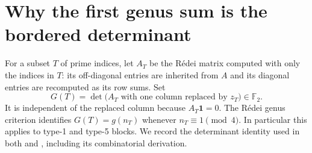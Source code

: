 \documentclass[11pt,a4paper]{article}
\theoremstyle{definition}
\newcommand{\FF}{\mathbb F_2}
\newcommand{\one}{\boldsymbol{1}}
\begin{document}
\section{Why the first genus sum is the bordered determinant}\label{sec:det}

For a subset $T$ of prime indices, let $A_T$ be the
R\'edei matrix computed with only the indices in $T$:
its off-diagonal entries are inherited from $A$ and
its diagonal entries are recomputed as its row sums.
Set
\[
 G(T)=\det\bigl(A_T\text{ with one column replaced by }z_T\bigr)
       \in\FF.
\]
It is independent of the replaced column because $A_T\one=0$.
The R\'edei genus criterion identifies $G(T)=g(n_T)$
whenever $n_T\equiv1\pmod4$.  In particular this applies
to type-1 and type-5 blocks.  We record the determinant
identity used in both \cite{Smith} and \cite[\S6.2]{Jaswal},
including its combinatorial derivation.
\end{document}
